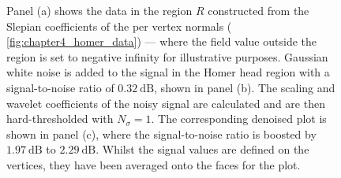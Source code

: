 \begin{figure}[htp]
	\centering\capstart
	\hfill
	\hfill
	\caption[
		A denoising demonstration for a field on the Homer mesh
	]{
		Panel (a) shows the data in the region \(R\) constructed from the Slepian coefficients of the per vertex normals (\cf{} \cref{fig:chapter4_homer_data}) --- where the field value outside the region is set to negative infinity for illustrative purposes.
		Gaussian white noise is added to the signal in the Homer head region with a signal-to-noise ratio of \(\SI{0.32}{\dB}\), shown in panel (b).
		The scaling and wavelet coefficients of the noisy signal are calculated and are then hard-thresholded with \(N_{\sigma}=1\).
		The corresponding denoised plot is shown in panel (c), where the signal-to-noise ratio is boosted by \(\SI{1.97}{\dB}\) to \(\SI{2.29}{\dB}\).
		Whilst the signal values are defined on the vertices, they have been averaged onto the faces for the plot.
	}\label{fig:chapter4_denoising}
\end{figure}
